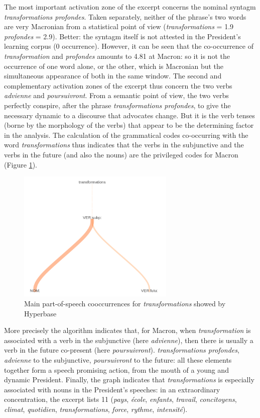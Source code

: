 The most important activation zone of the excerpt concerns the nominal syntagm \textit{transformations profondes}. Taken separately, neither of the phrase's two words are very Macronian from a statistical point of view (\textit{transformations} = 1.9 \textit{profondes} = 2.9). Better: the syntagm itself is not attested in the President's learning corpus (0 occurrence). However, it can be seen that the co-occurrence of \textit{transformation} and \textit{profondes} amounts to 4.81 at Macron: so it is not the occurrence of one word alone, or the other, which is Macronian but the simultaneous appearance of both in the same window. The second and complementary activation zones of the excerpt thus concern the two verbs \textit{advienne} and \textit{poursuivront}. From a semantic point of view, the two verbs perfectly conspire, after the phrase \textit{transformations profondes}, to give the necessary dynamic to a discourse that advocates change. But it is the verb tenses (borne by the morphology of the verbs) that appear to be the determining factor in the analysis. The calculation of the grammatical codes co-occurring with the word \textit{transformations} thus indicates that the verbs in the subjunctive and the verbs in the future (and also the nouns) are the privileged codes for Macron (Figure \ref{macron}). 

\begin{figure}[h]
\begin{center}
\includegraphics[width=7.5cm]{img/macron_cooc.png}
\caption{Main part-of-speech cooccurrences for \textit{transformations} showed by Hyperbase}
\label{macron}
\end{center}
\end{figure}


More precisely the algorithm indicates that, for Macron, when \textit{transformation} is associated with a verb in the subjunctive (here \textit{advienne}), then there is usually a verb in the future co-present (here \textit{poursuivront}). \textit{transformations profondes}, \textit{advienne} to the subjunctive, \textit{poursuivront} to the future: all these elements together form a speech promising action, from the mouth of a young and dynamic President. Finally, the graph indicates that \textit{transformations} is especially associated with nouns in the President's speeches: in an extraordinary concentration, the excerpt lists 11 (\textit{pays}, \textit{école}, \textit{enfants}, \textit{travail}, \textit{concitoyens}, \textit{climat}, \textit{quotidien}, \textit{transformations}, \textit{force}, \textit{rythme}, \textit{intensité}).

